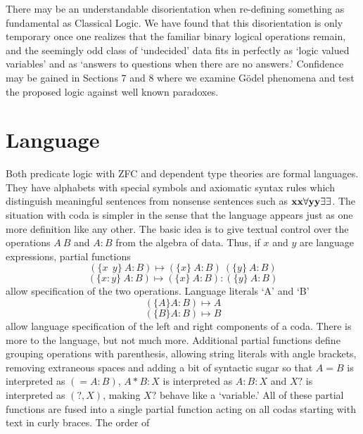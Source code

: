 \documentclass[11pt]{article}
\begin{document}
There may be an understandable disorientation when re-defining something
as fundamental as Classical Logic.  We have found that this disorientation is only temporary once one realizes that the familiar binary logical operations remain,
 and the seemingly odd class of `undecided' data fits in perfectly as `logic valued variables' and as `answers to questions when there are no answers.'  Confidence may
 be gained in Sections 7 and 8 where we examine G\"{o}del phenomena and test the proposed logic against well known paradoxes.

\section{Language}

Both predicate logic with ZFC and dependent type theories are formal languages.  They have alphabets with special symbols
and axiomatic syntax rules which distinguish meaningful sentences from nonsense sentences such as ${\bf xx\forall yy\exists\exists}$.
The situation with coda is simpler in the sense that the language appears just as one more definition like any other.
The basic idea is to give textual control over the operations $A\ B$ and $A:B$ from the algebra of data.
Thus, if $x$ and $y$ are language expressions, partial functions
\begin{equation} \label{eqn}
( \{x\ \ y\} \ A : B ) \mapsto (\{x\}\ A : B)\ (\{y\}\ A : B)
\end{equation}
\begin{equation} \label{eqn}
( \{x : y\} \ A : B ) \mapsto (\{x\}\ A : B):(\{y\}\ A : B)
\end{equation}
allow specification of the two operations.  Language literals `A' and `B'
\begin{equation}\label{eqn}
(\{A\} A:B)\mapsto A
\end{equation}
\begin{equation}\label{eqn}
(\{B\} A:B)\mapsto B
\end{equation}
allow language specification of the left and right components of a coda.  There is more to the language, but not much more.  Additional partial functions
define grouping operations with parenthesis, allowing string literals with angle brackets, removing extraneous spaces and adding a bit of syntactic
sugar so that $A=B$ is interpreted as $(=A:B)$, $A*B:X$ is interpreted as $A:B:X$ and $X?$ is interpreted as $(?,X)$, making $X?$ behave like
a `variable.'  All of these partial functions are fused into a single partial function acting on all codas starting with text in curly braces.  The order of
\end{document}
